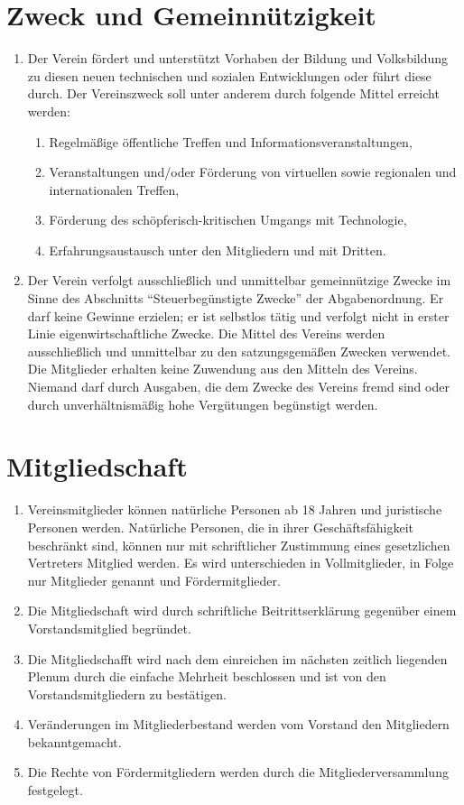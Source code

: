 \documentclass[ngerman]{scrartcl}
\begin{document}
\section{Zweck und Gemeinnützigkeit} \label{sec:zweck}
\begin{enumerate}
 \item Der Verein fördert und unterstützt Vorhaben der Bildung und Volksbildung zu
 diesen neuen technischen und sozialen Entwicklungen oder führt diese durch.
 Der Vereinszweck soll unter anderem durch folgende Mittel erreicht werden:
\begin{enumerate}
\item Regelmäßige öffentliche Treffen und Informationsveranstaltungen,
\item Veranstaltungen und/oder Förderung von virtuellen sowie regionalen und internationalen Treffen,
\item Förderung des schöpferisch-kritischen Umgangs mit Technologie,
\item Erfahrungsaustausch unter den Mitgliedern und mit Dritten.\
\end{enumerate}
\item Der Verein verfolgt ausschließlich und unmittelbar gemeinnützige Zwecke 
im Sinne des Abschnitts ``Steuerbegünstigte Zwecke'' der Abgabenordnung. 
Er darf keine Gewinne erzielen; er ist selbstlos tätig und verfolgt 
nicht in erster Linie eigenwirtschaftliche Zwecke. Die Mittel des Vereins werden ausschließlich und unmittelbar zu den satzungsgemäßen 
Zwecken verwendet. Die Mitglieder erhalten keine Zuwendung aus den 
Mitteln des Vereins. Niemand darf durch Ausgaben, die dem Zwecke des 
Vereins fremd sind oder durch unverhältnismäßig hohe Vergütungen begünstigt werden.
\end{enumerate}
\section{Mitgliedschaft} \label{sec:mitgliedschaft}
\begin{enumerate}
 \item Vereinsmitglieder können natürliche Personen ab 18 Jahren
 und  juristische Personen werden. Natürliche Personen, die in
 ihrer Geschäftsfähigkeit beschränkt sind, können nur mit
 schriftlicher Zustimmung eines gesetzlichen Vertreters
 Mitglied werden. Es wird unterschieden in Vollmitglieder, in
 Folge nur Mitglieder genannt und Fördermitglieder.

 \item Die Mitgliedschaft wird durch schriftliche
 Beitrittserklärung gegenüber einem Vorstandsmitglied
 begründet.

 \item Die Mitgliedschafft wird nach dem einreichen im nächsten
 zeitlich liegenden Plenum durch die einfache Mehrheit beschlossen
 und ist von den Vorstandsmitgliedern zu bestätigen.

 \item Veränderungen im Mitgliederbestand werden vom Vorstand
 den Mitgliedern bekanntgemacht.

 \item Die Rechte von Fördermitgliedern werden durch die
 Mitgliederversammlung festgelegt.
\end{enumerate}
\end{document}
